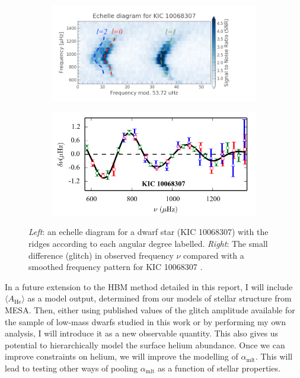 \begin{figure}
    \begin{subfigure}[b]{0.5\linewidth}
        \centering
        \includegraphics[trim={1cm 0 2.5cm 0},clip,width=\linewidth]{future/KIC10068307_echelle.png}
    \end{subfigure}%
    \begin{subfigure}[b]{0.5\linewidth}
        \centering
        \includegraphics[width=\linewidth]{future/KIC10068307_glitch.png}
    \end{subfigure}
    \caption{\emph{Left}: an echelle diagram for a dwarf star (KIC 10068307) with the ridges according to each angular degree labelled. \emph{Right}: The small difference (glitch) in observed frequency $\nu$ compared with a smoothed frequency pattern for KIC 10068307 \citep{Verma.Raodeo.ea2017}.}
    \label{fig:glitch}
\end{figure}

In a future extension to the HBM method detailed in this report, I will include $\langle A_{\mathrm{He}} \rangle$ as a model output, determined from our models of stellar structure from MESA. Then, either using published values of the glitch amplitude available for the sample of low-mass dwarfs studied in this work \citep[e.g.][]{Verma.Raodeo.ea2017} or by performing my own analysis, I will introduce it as a new observable quantity. This also gives us potential to hierarchically model the surface helium abundance. Once we can improve constraints on helium, we will improve the modelling of $\alpha_\mathrm{mlt}$. This will lead to testing other ways of pooling $\alpha_\mathrm{mlt}$ as a function of stellar properties.


